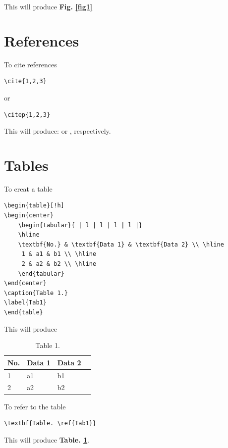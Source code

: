 \noindent This will produce \textbf{Fig. \ref{fig1}}

\section{References}

To cite references

\begin{verbatim}
\cite{1,2,3}
\end{verbatim}
or
\begin{verbatim}
\citep{1,2,3}
\end{verbatim}

\noindent This will produce: \cite{1,2,3} or \citep{1,2,3}, respectively.

\section{Tables}

To creat a table

\begin{verbatim}
\begin{table}[!h]
\begin{center}
    \begin{tabular}{ | l | l | l | l |}
    \hline
    \textbf{No.} & \textbf{Data 1} & \textbf{Data 2} \\ \hline
     1 & a1 & b1 \\ \hline
     2 & a2 & b2 \\ \hline
    \end{tabular}
\end{center}
\caption{Table 1.}
\label{Tab1}
\end{table}
\end{verbatim}

\noindent This will produce

\begin{table}[!h]
\begin{center}
    \begin{tabular}{ | l | l | l | l |}
    \hline
    \textbf{No.} & \textbf{Data 1} & \textbf{Data 2} \\ \hline
     1 & a1 & b1 \\ \hline
     2 & a2 & b2 \\ \hline
    \end{tabular}
\end{center}
\caption{Table 1.}
\label{Tab1}
\end{table}

\noindent To refer to the table

\begin{verbatim}
\textbf{Table. \ref{Tab1}}
\end{verbatim}

\noindent This will produce \textbf{Table. \ref{Tab1}}.

\cleardoublepage